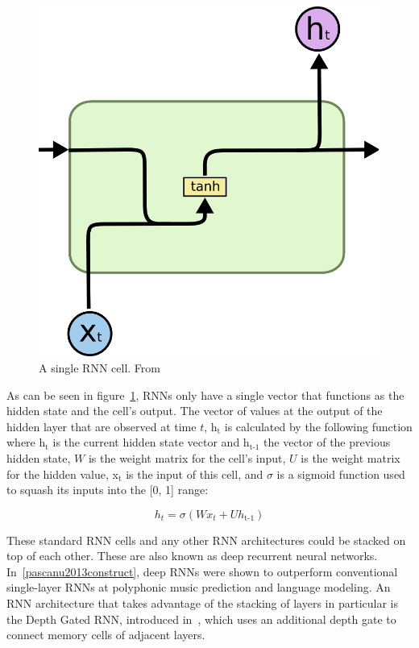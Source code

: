 \begin{figure}
	\begin{center}
		\includegraphics[scale=0.5]{rnn/rnn_cell}
	\end{center}
	\caption{A single RNN cell. From~\cite{olah2015understanding}\label{fig:rnn_cell}}
\end{figure}

As can be seen in figure~\ref{fig:rnn_cell}, RNNs only have a single vector that functions as the hidden state and the cell's output. The vector of values at the output of the hidden layer that are observed at time \(t\), h\(_{\text{t}}\) is calculated by the following function where h\(_{\text{t}}\) is the current hidden state vector and h\(_{\text{t-1}}\) the vector of the previous hidden state, \(W\) is the weight matrix for the cell's input, \(U\) is the weight matrix for the hidden value, x\(_{\text{t}}\) is the input of this cell, and \(\sigma \) is a sigmoid function used to squash its inputs into the [0, 1] range:

\begin{equation} \label{eq:something}
h_t = \sigma(Wx_t + Uh_\text{t-1})
\end{equation}

These standard RNN cells and any other RNN architectures could be stacked on top of each other. These are also known as deep recurrent neural networks. In~\ref{pascanu2013construct}, deep RNNs were shown to outperform conventional single-layer RNNs at polyphonic music prediction and language modeling. An RNN architecture that takes advantage of the stacking of layers in particular is the Depth Gated RNN, introduced in~\cite{yao2015depth}, which uses an additional depth gate to connect memory cells of adjacent layers.

